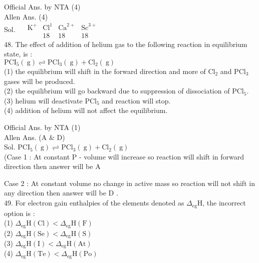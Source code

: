 \documentclass[10pt]{article}
\begin{document}
Official Ans. by NTA (4)\\
Allen Ans. (4)\\
Sol. \(\quad \begin{array}{cccc}\mathrm{K}^{+} & \mathrm{Cl}^{1} & \mathrm{Ca}^{2+} & \mathrm{Sc}^{3+} \\ & 18 & 18 & 18\end{array}\)\\
48. The effect of addition of helium gas to the following reaction in equilibrium state, is :\\
\(\mathrm{PCI}_{5}(\mathrm{~g}) \rightleftharpoons \mathrm{PCl}_{3}(\mathrm{~g})+\mathrm{Cl}_{2}(\mathrm{~g})\)\\
(1) the equilibrium will shift in the forward direction and more of \(\mathrm{Cl}_{2}\) and \(\mathrm{PCl}_{3}\) gases will be produced.\\
(2) the equilibrium will go backward due to suppression of dissociation of \(\mathrm{PCl}_{5}\).\\
(3) helium will deactivate \(\mathrm{PCl}_{5}\) and reaction will stop.\\
(4) addition of helium will not affect the equilibrium.

Official Ans. by NTA (1)\\
Allen Ans. (A \& D)\\
Sol. \(\mathrm{PCI}_{5}(\mathrm{~g}) \rightleftharpoons \mathrm{PCl}_{3}(\mathrm{~g})+\mathrm{Cl}_{2}(\mathrm{~g})\)\\
(Case 1 : At constant P - volume will increase so reaction will shift in forward direction then answer will be A

Case 2 : At constant volume no change in active mass so reaction will not shift in any direction then answer will be D .\\
49. For electron gain enthalpies of the elements denoted as \(\Delta_{\mathrm{eg}} \mathrm{H}\), the incorrect option is :\\
(1) \(\Delta_{\mathrm{eg}} \mathrm{H}(\mathrm{Cl})<\Delta_{\mathrm{eg}} \mathrm{H}(\mathrm{F})\)\\
(2) \(\Delta_{\mathrm{eg}} \mathrm{H}(\mathrm{Se})<\Delta_{\mathrm{eg}} \mathrm{H}(\mathrm{S})\)\\
(3) \(\Delta_{\mathrm{eg}} \mathrm{H}(\mathrm{I})<\Delta_{\mathrm{eg}} \mathrm{H}(\mathrm{At})\)\\
(4) \(\Delta_{\mathrm{eg}} \mathrm{H}(\mathrm{Te})<\Delta_{\mathrm{eg}} \mathrm{H}(\mathrm{Po})\)
\end{document}
